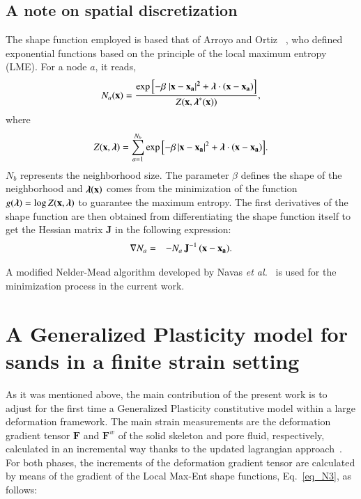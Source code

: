 \documentclass[preprint,12pt,a4paper]{elsarticle}
\begin{document}
\subsection{A note on spatial discretization}
\label{subsec:23}
The shape function employed is based that of Arroyo and Ortiz ~\cite{arroyo2006}, who defined exponential  functions based on the principle of  the local maximum entropy (LME).  For a node $a$, it reads,
\begin{equation} \label{eq_N1}
N_a(\textbf{x})=\frac{\exp\left[ -\beta \; |\bf x-x_a|^2 +  \boldsymbol{\lambda}  \cdot  (x-x_a)         \right] } {Z(\textbf{x},\boldsymbol{\lambda}^*(\textbf{x}))},
\end{equation}
where
\begin{equation}\label{eq_N2}
Z({\bf x}, {\boldsymbol{\lambda}}) = \sum_{a=1}^{N_b}{ \exp \left[ -\beta \, |{\bf x-x_a}|^2 + \boldsymbol{\lambda}  \cdot  \bf {(x-x_a)}         \right]}.
\end{equation}
$N_b$ represents the neighborhood size. The parameter $\beta$ defines the shape of the neighborhood and $\boldsymbol{\lambda}(\bf x)$ comes from the minimization of the function $g(\boldsymbol{\lambda})=\log Z(\bf x, \boldsymbol{\lambda})$ to guarantee the maximum entropy. The first derivatives of the shape function are then obtained from differentiating the shape function itself to get the Hessian matrix \textbf{J}  in the following expression:
\begin{eqnarray}
\nabla N_a &=& -N_a \,  \textbf{J}^{-1} \,  (\bf x-x_a) \label{eq_N3}.
\end{eqnarray}

A modified Nelder-Mead algorithm developed by Navas {\it et al.}~\cite{Navas2018} is used for the minimization process in the current work.
 
\section{A Generalized Plasticity model for sands in a finite strain setting  
}
\label{subsec:24}
As it was mentioned above, the main contribution of the present work is to adjust for the first time a Generalized Plasticity constitutive model within a large deformation framework. The main strain measurements are the deformation gradient tensor $\mathbf{F}$ and $\mathbf{F}^w$ of the solid skeleton and pore fluid, respectively, calculated in an incremental way thanks to the updated lagrangian approach~\cite{Bonet2008}. For both phases, the increments of the deformation gradient tensor are calculated by means of the gradient of the Local Max-Ent shape functions, Eq.~\eqref{eq_N3}, as follows:
\end{document}
